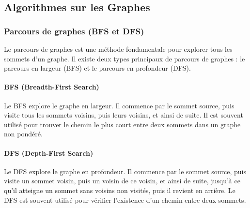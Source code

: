 \subsection{Algorithmes sur les Graphes}\label{subsec:algorithmes-sur-les-graphes}

\subsubsection{Parcours de graphes (BFS et DFS)}
Le parcours de graphes est une méthode fondamentale pour explorer tous les sommets d'un graphe.
Il existe deux types principaux de parcours de graphes : le parcours en largeur (BFS) et le parcours en profondeur (DFS).

\paragraph{BFS (Breadth-First Search)}
Le BFS explore le graphe en largeur.
Il commence par le sommet source, puis visite tous les sommets voisins, puis leurs voisins, et ainsi de suite.
Il est souvent utilisé pour trouver le chemin le plus court entre deux sommets dans un graphe non pondéré.
\newline
{}


\paragraph{DFS (Depth-First Search)}
Le DFS explore le graphe en profondeur.
Il commence par le sommet source, puis visite un sommet voisin, puis un voisin de ce voisin, et ainsi de suite, jusqu'à ce qu'il atteigne un sommet sans voisins non visités, puis il revient en arrière.
Le DFS est souvent utilisé pour vérifier l'existence d'un chemin entre deux sommets.

